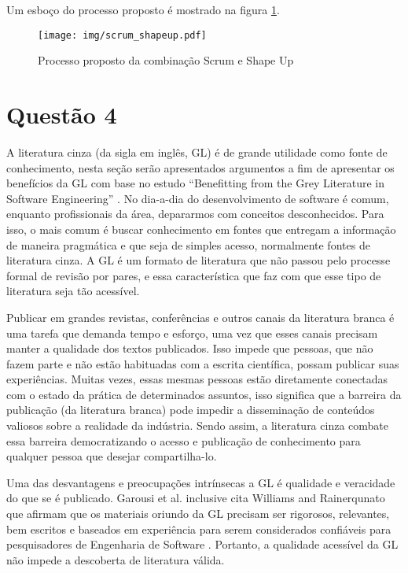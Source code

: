\documentclass[12pt]{article}
\begin{document}
Um esboço do processo proposto é mostrado na figura \ref{fig:scrum_shapeup}.
\begin{figure}[ht]
    \centering
    \texttt{[image: img/scrum\_shapeup.pdf]}
    \caption{Processo proposto da combinação Scrum e Shape Up}
    \label{fig:scrum_shapeup}
\end{figure}

\section{Questão 4}
A literatura cinza (da sigla em inglês, GL) é de grande utilidade como fonte de conhecimento, nesta seção serão apresentados argumentos a fim de apresentar os benefícios da GL com base no estudo ``Benefitting from the Grey Literature in Software Engineering'' \cite{garousi2020benefitting}. No dia-a-dia do desenvolvimento de software é comum, enquanto profissionais da área, depararmos com conceitos desconhecidos. Para isso, o mais comum é buscar conhecimento em fontes que entregam a informação de maneira pragmática e que seja de simples acesso, normalmente fontes de literatura cinza. A GL é um formato de literatura que não passou pelo processe formal de revisão por pares, e essa característica que faz com que esse tipo de literatura seja tão acessível.

Publicar em grandes revistas, conferências e outros canais da literatura branca é uma tarefa que demanda tempo e esforço, uma vez que esses canais precisam manter a qualidade dos textos publicados. Isso impede que pessoas, que não fazem parte e não estão habituadas com a escrita científica, possam publicar suas experiências. Muitas vezes, essas mesmas pessoas estão diretamente conectadas com o estado da prática de determinados assuntos, isso significa que a barreira da publicação (da literatura branca) pode impedir a disseminação de conteúdos valiosos sobre a realidade da indústria. Sendo assim, a literatura cinza combate essa barreira democratizando o acesso e publicação de conhecimento para qualquer pessoa que desejar compartilha-lo. 

Uma das desvantagens e preocupações intrínsecas a GL é qualidade e veracidade do que se é publicado. Garousi et al. inclusive cita Williams and Rainerqunato que afirmam que os materiais oriundo da GL precisam ser rigorosos, relevantes, bem escritos e baseados em experiência para serem considerados confiáveis para pesquisadores de Engenharia de Software \cite{williams2017toward}. Portanto, a qualidade acessível da GL não impede a descoberta de literatura válida. 
\end{document}

